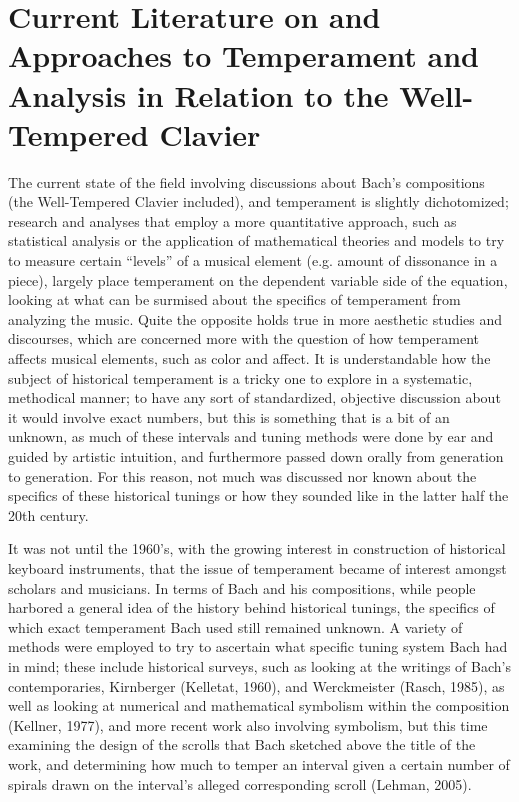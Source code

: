     \section{Current Literature on and Approaches to Temperament and
Analysis in Relation to the Well-Tempered
Clavier}\label{current-literature-on-and-approaches-to-temperament-and-analysis-in-relation-to-the-well-tempered-clavier}

The current state of the field involving discussions about Bach's
compositions (the Well-Tempered Clavier included), and temperament is
slightly dichotomized; research and analyses that employ a more
quantitative approach, such as statistical analysis or the application
of mathematical theories and models to try to measure certain ``levels''
of a musical element (e.g. amount of dissonance in a piece), largely
place temperament on the dependent variable side of the equation,
looking at what can be surmised about the specifics of temperament from
analyzing the music. Quite the opposite holds true in more aesthetic
studies and discourses, which are concerned more with the question of
how temperament affects musical elements, such as color and affect. It
is understandable how the subject of historical temperament is a tricky
one to explore in a systematic, methodical manner; to have any sort of
standardized, objective discussion about it would involve exact numbers,
but this is something that is a bit of an unknown, as much of these
intervals and tuning methods were done by ear and guided by artistic
intuition, and furthermore passed down orally from generation to
generation. For this reason, not much was discussed nor known about the
specifics of these historical tunings or how they sounded like in the
latter half the 20th century.

It was not until the 1960's, with the growing interest in construction
of historical keyboard instruments, that the issue of temperament became
of interest amongst scholars and musicians. In terms of Bach and his
compositions, while people harbored a general idea of the history behind
historical tunings, the specifics of which exact temperament Bach used
still remained unknown. A variety of methods were employed to try to
ascertain what specific tuning system Bach had in mind; these include
historical surveys, such as looking at the writings of Bach's
contemporaries, Kirnberger (Kelletat, 1960), and Werckmeister (Rasch,
1985), as well as looking at numerical and mathematical symbolism within
the composition (Kellner, 1977), and more recent work also involving
symbolism, but this time examining the design of the scrolls that Bach
sketched above the title of the work, and determining how much to temper
an interval given a certain number of spirals drawn on the interval's
alleged corresponding scroll (Lehman, 2005).

